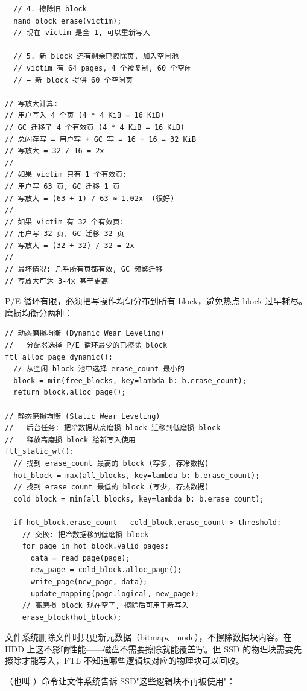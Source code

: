 \begin{filesystemlayout}
\begin{lstlisting}
  // 4. 擦除旧 block
  nand_block_erase(victim);
  // 现在 victim 是全 1, 可以重新写入

  // 5. 新 block 还有剩余已擦除页, 加入空闲池
  // victim 有 64 pages, 4 个被复制, 60 个空闲
  // → 新 block 提供 60 个空闲页

// 写放大计算:
// 用户写入 4 个页 (4 * 4 KiB = 16 KiB)
// GC 迁移了 4 个有效页 (4 * 4 KiB = 16 KiB)
// 总闪存写 = 用户写 + GC 写 = 16 + 16 = 32 KiB
// 写放大 = 32 / 16 = 2x
//
// 如果 victim 只有 1 个有效页:
// 用户写 63 页, GC 迁移 1 页
// 写放大 = (63 + 1) / 63 ≈ 1.02x  (很好)
//
// 如果 victim 有 32 个有效页:
// 用户写 32 页, GC 迁移 32 页
// 写放大 = (32 + 32) / 32 = 2x
//
// 最坏情况: 几乎所有页都有效, GC 频繁迁移
// 写放大可达 3-4x 甚至更高
\end{lstlisting}


P/E 循环有限，必须把写操作均匀分布到所有 block，避免热点 block 过早耗尽。磨损均衡分两种：

\begin{lstlisting}
// 动态磨损均衡 (Dynamic Wear Leveling)
//   分配器选择 P/E 循环最少的已擦除 block
ftl_alloc_page_dynamic():
  // 从空闲 block 池中选择 erase_count 最小的
  block = min(free_blocks, key=lambda b: b.erase_count);
  return block.alloc_page();

// 静态磨损均衡 (Static Wear Leveling)
//   后台任务: 把冷数据从高磨损 block 迁移到低磨损 block
//   释放高磨损 block 给新写入使用
ftl_static_wl():
  // 找到 erase_count 最高的 block (写多, 存冷数据)
  hot_block = max(all_blocks, key=lambda b: b.erase_count);
  // 找到 erase_count 最低的 block (写少, 存热数据)
  cold_block = min(all_blocks, key=lambda b: b.erase_count);

  if hot_block.erase_count - cold_block.erase_count > threshold:
    // 交换: 把冷数据移到低磨损 block
    for page in hot_block.valid_pages:
      data = read_page(page);
      new_page = cold_block.alloc_page();
      write_page(new_page, data);
      update_mapping(page.logical, new_page);
    // 高磨损 block 现在空了, 擦除后可用于新写入
    erase_block(hot_block);
\end{lstlisting}


文件系统删除文件时只更新元数据（bitmap、inode），不擦除数据块内容。在 HDD 上这不影响性能——磁盘不需要擦除就能覆盖写。但 SSD 的物理块需要先擦除才能写入，FTL 不知道哪些逻辑块对应的物理块可以回收。

（也叫 ）命令让文件系统告诉 SSD"这些逻辑块不再被使用"：


\end{filesystemlayout}
